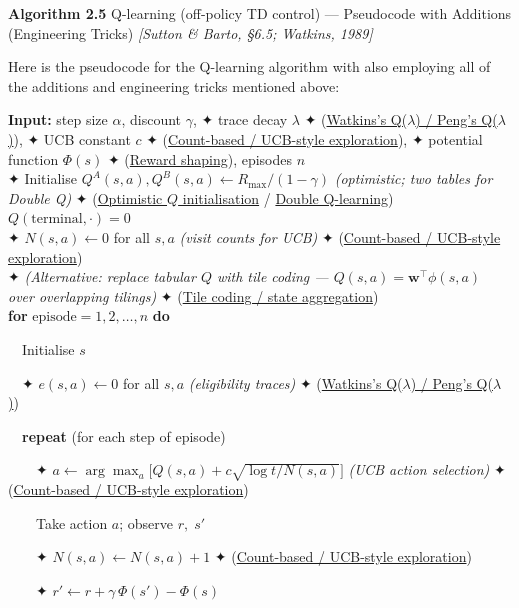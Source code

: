 \documentclass[11pt]{article}
\begin{document}
    \begin{pseudobox}

\textbf{Algorithm 2.5} Q-learning (off-policy TD control) --- Pseudocode
with Additions (Engineering Tricks) \emph{{[}Sutton \& Barto, §6.5;
Watkins, 1989{]}}

\tcbline

Here is the pseudocode for the Q-learning algorithm with also employing
all of the additions and engineering tricks mentioned above:

\textbf{Input:} step size \(\alpha\), discount \(\gamma\), ✦ trace decay
\(\lambda\) ✦ (\hyperref[trick-2-5-2]{Watkins's Q(\(\lambda\)) / Peng's
Q(\(\lambda\))}), ✦ UCB constant \(c\) ✦
(\hyperref[trick-2-5-4]{Count-based / UCB-style exploration}), ✦
potential function \(\Phi(s)\) ✦ (\hyperref[trick-2-5-5]{Reward
shaping}), episodes \(n\)\\
✦ Initialise \(Q^A(s,a), Q^B(s,a) \leftarrow R_\text{max}/(1-\gamma)\)
\emph{(optimistic; two tables for Double Q)} ✦
(\hyperref[trick-2-5-6]{Optimistic \(Q\) initialisation} /
\hyperref[trick-2-5-1]{Double Q-learning})\\
\(Q(\text{terminal}, \cdot) = 0\)\\
✦ \(N(s,a) \leftarrow 0\) for all \(s, a\) \emph{(visit counts for UCB)}
✦ (\hyperref[trick-2-5-4]{Count-based / UCB-style exploration})\\
✦ \emph{(Alternative: replace tabular \(Q\) with tile coding ---
\(Q(s,a)=\mathbf{w}^\top\phi(s,a)\) over overlapping tilings)} ✦
(\hyperref[trick-2-5-3]{Tile coding / state aggregation})\\
\textbf{for} \(\text{episode} = 1, 2, \ldots, n\) \textbf{do}\\
\strut ~~Initialise \(s\)\\
\strut ~~✦ \(e(s,a) \leftarrow 0\) for all \(s, a\) \emph{(eligibility
traces)} ✦ (\hyperref[trick-2-5-2]{Watkins's Q(\(\lambda\)) / Peng's
Q(\(\lambda\))})\\
\strut ~~\textbf{repeat} (for each step of episode)\\
\strut ~~~~✦
\(a \leftarrow \arg\max_a \bigl[Q(s,a) + c\sqrt{\log t / N(s,a)}\bigr]\)
\emph{(UCB action selection)} ✦ (\hyperref[trick-2-5-4]{Count-based /
UCB-style exploration})\\
\strut ~~~~Take action \(a\); observe \(r,\; s'\)\\
\strut ~~~~✦ \(N(s,a) \leftarrow N(s,a) + 1\) ✦
(\hyperref[trick-2-5-4]{Count-based / UCB-style exploration})\\
\strut ~~~~✦ \(r' \leftarrow r + \gamma\,\Phi(s') - \Phi(s)\)

\end{pseudobox}
\end{document}
